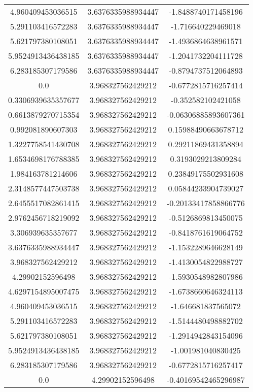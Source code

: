\begin{table}
\begin{tabular}{ccc}
4.960409453036515 & 3.6376335988934447 & -1.8488740171458196 \\
5.291103416572283 & 3.6376335988934447 & -1.716640229469018 \\
5.621797380108051 & 3.6376335988934447 & -1.4936864638961571 \\
5.9524913436438185 & 3.6376335988934447 & -1.2041732204111728 \\
6.283185307179586 & 3.6376335988934447 & -0.8794737512064893 \\
0.0 & 3.968327562429212 & -0.6772815716257414 \\
0.3306939635357677 & 3.968327562429212 & -0.352582102421058 \\
0.6613879270715354 & 3.968327562429212 & -0.06306885893607361 \\
0.992081890607303 & 3.968327562429212 & 0.15988490663678712 \\
1.3227758541430708 & 3.968327562429212 & 0.29211869431358894 \\
1.6534698176788385 & 3.968327562429212 & 0.3193029213809284 \\
1.984163781214606 & 3.968327562429212 & 0.23849175502931608 \\
2.3148577447503738 & 3.968327562429212 & 0.05844233904739027 \\
2.6455517082861415 & 3.968327562429212 & -0.20133417858866776 \\
2.9762456718219092 & 3.968327562429212 & -0.5126869813450075 \\
3.306939635357677 & 3.968327562429212 & -0.8418761619064752 \\
3.6376335988934447 & 3.968327562429212 & -1.1532289646628149 \\
3.968327562429212 & 3.968327562429212 & -1.4130054822988727 \\
4.29902152596498 & 3.968327562429212 & -1.5930548982807986 \\
4.6297154895007475 & 3.968327562429212 & -1.6738660646324113 \\
4.960409453036515 & 3.968327562429212 & -1.646681837565072 \\
5.291103416572283 & 3.968327562429212 & -1.5144480498882702 \\
5.621797380108051 & 3.968327562429212 & -1.2914942843154096 \\
5.9524913436438185 & 3.968327562429212 & -1.001981040830425 \\
6.283185307179586 & 3.968327562429212 & -0.6772815716257417 \\
0.0 & 4.29902152596498 & -0.40169542465296987 \\

\end{tabular}
\end{table}
